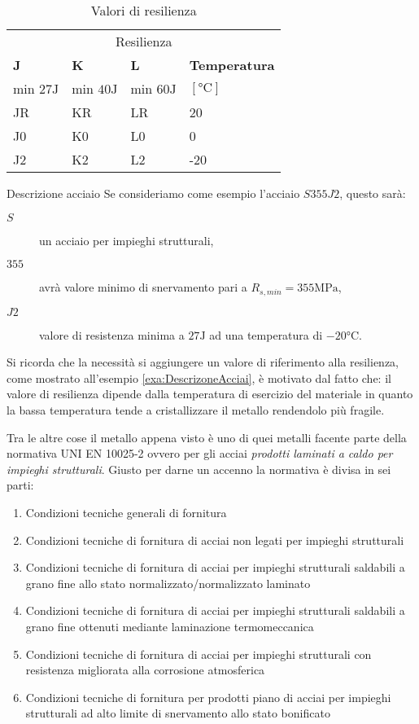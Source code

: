 \begin{table}
\centering
\caption{Valori di resilienza}\label{tab:ValRes}
\begin{tabularx}{\textwidth}{XXXX}
\toprule
\multicolumn{4}{c}{Resilienza}\\
\textbf{J} & \textbf{K} & \textbf{L} & \textbf{Temperatura}\\
min $27\unit{\J}$ & min $40\unit{\J}$ & min $60\unit{\J}$ & $\left[\unit{\celsius}\right]$\\
\midrule
JR & KR & LR & 20\\
J0 & K0 & L0 & 0\\
J2 & K2 & L2 & -20\\
\bottomrule
\end{tabularx}
\end{table}

\begin{example}{Descrizione acciaio}
Se consideriamo come esempio l'acciaio $S355J2$, questo sarà:
\begin{description}
\item[$S$] un acciaio per impieghi strutturali,
\item[$355$] avrà valore minimo di snervamento pari a $R_{s,min} = 355\unit{\MPa}$,
\item[$J2$] valore di resistenza minima a $27\unit{\J}$ ad una temperatura di $-20\unit{\celsius}$.
\end{description}\label{exa:DescrizoneAcciai}
\end{example}%
Si ricorda che la necessità si aggiungere un valore di riferimento alla resilienza, come mostrato all'esempio \ref{exa:DescrizoneAcciai}, è motivato dal fatto che: il valore di resilienza dipende dalla temperatura di esercizio del materiale in quanto la bassa temperatura tende a cristallizzare il metallo rendendolo più fragile.

Tra le altre cose il metallo appena visto è uno di quei metalli facente parte della normativa UNI EN 10025-2 ovvero per gli acciai \textit{prodotti laminati a caldo per impieghi strutturali}. Giusto per darne un accenno la normativa è divisa in sei parti:
\begin{enumerate}
\item Condizioni tecniche generali di fornitura
\item Condizioni tecniche di fornitura di acciai non legati per impieghi strutturali
\item Condizioni tecniche di fornitura di acciai per impieghi strutturali saldabili a grano fine allo stato normalizzato/normalizzato laminato
\item Condizioni tecniche di fornitura di acciai per impieghi strutturali saldabili a grano fine ottenuti mediante laminazione termomeccanica
\item Condizioni tecniche di fornitura di acciai per impieghi strutturali con resistenza migliorata alla corrosione atmosferica
\item Condizioni tecniche di fornitura per prodotti piano di acciai per impieghi strutturali ad alto limite di snervamento allo stato bonificato
\end{enumerate}

